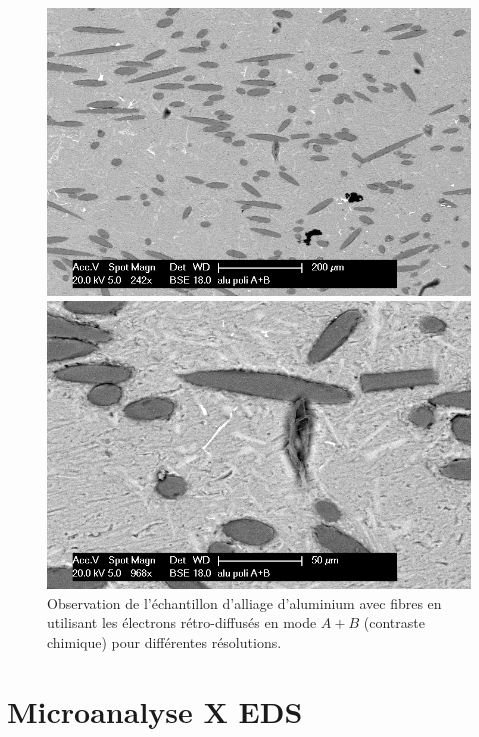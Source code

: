 \documentclass[a4paper,12pt]{article}
\begin{document}
\begin{figure}
\begin{minipage}[c]{.5\linewidth}
\centering
\includegraphics[width=1\textwidth]{images/alu_er_apb.png}
 \end{minipage}\hfill
\begin{minipage}[c]{.5\linewidth}
\centering
\includegraphics[width=1\textwidth]{images/alu_er_apb_g.png}
\end{minipage}
\caption{Observation de l'échantillon d'alliage d'aluminium avec fibres en utilisant les électrons rétro-diffusés en mode $A+B$ (contraste chimique) pour différentes résolutions.}
\label{fig:alu_poli_a+b}
\end{figure}

\section{Microanalyse X EDS}
\end{document}
